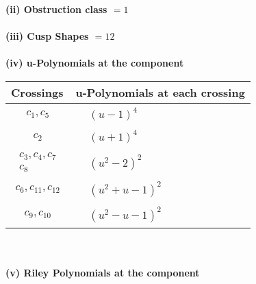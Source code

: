 \documentclass[1p]{elsarticle_modified}
\theoremstyle{definition}
\begin{document}
\flushleft \textbf{(ii) Obstruction class $= 1$}\\~\\
\flushleft \textbf{(iii) Cusp Shapes $= 12$}\\~\\
\newpage\renewcommand{\arraystretch}{1}
\flushleft \textbf{(iv) u-Polynomials at the component}\newline \\
\begin{tabular}{m{50pt}|m{274pt}}
Crossings & \hspace{64pt}u-Polynomials at each crossing \\
\hline $$\begin{aligned}c_{1},c_{5}\end{aligned}$$&$\begin{aligned}
&(u-1)^4
\end{aligned}$\\
\hline $$\begin{aligned}c_{2}\end{aligned}$$&$\begin{aligned}
&(u+1)^4
\end{aligned}$\\
\hline $$\begin{aligned}c_{3},c_{4},c_{7}\\c_{8}\end{aligned}$$&$\begin{aligned}
&(u^2-2)^2
\end{aligned}$\\
\hline $$\begin{aligned}c_{6},c_{11},c_{12}\end{aligned}$$&$\begin{aligned}
&(u^2+u-1)^2
\end{aligned}$\\
\hline $$\begin{aligned}c_{9},c_{10}\end{aligned}$$&$\begin{aligned}
&(u^2- u-1)^2
\end{aligned}$\\
\hline
\end{tabular}\\~\\
\newpage\renewcommand{\arraystretch}{1}
\flushleft \textbf{(v) Riley Polynomials at the component}\newline \\
\end{document}
